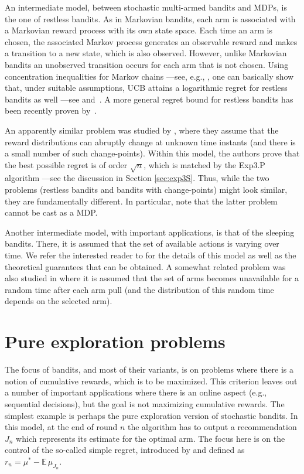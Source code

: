 \documentclass[11pt]{hackednow}
\newcommand{\E}{\mathbb{E}}
\begin{document}
An intermediate model, between stochastic multi-armed bandits and MDPs, is the one of restless bandits. As in Markovian bandits, each arm is associated with a Markovian reward process with its own state space. Each time an arm is chosen, the associated Markov process generates an observable reward and makes a transition to a new state, which is also observed. However, unlike Markovian bandits an unobserved transition occurs for each arm that is not chosen. Using concentration inequalities for Markov chains ---see, e.g., \cite{Lez98}, one can basically show that, under suitable assumptions, UCB attains a logarithmic regret for restless bandits as well ---see \cite{TL11} and~\cite{filippi2011optimally}. A more general regret bound for restless bandits has been recently proven by~\cite{ortner2012regret}.

An apparently similar problem was studied by \cite{GM11}, where they assume that the reward distributions can abruptly change at unknown time instants (and there is a small number of such change-points). Within this model, the authors prove that the best possible regret is of order $\sqrt{n}$, which is matched by the Exp3.P algorithm ---see the discussion in Section \ref{sec:exp3S}. Thus, while the two problems (restless bandits and bandits with change-points) might look similar, they are fundamentally different. In particular, note that the latter problem cannot be cast as a MDP.

Another intermediate model, with important applications, is that of the sleeping bandits. There, it is assumed that the set of available actions is varying over time. We refer the interested reader to \cite{KNS10, KMB09, slivkins2009contextual, KS12} for the details of this model as well as the theoretical guarantees that can be obtained. A somewhat related problem was also studied in \cite{GKSS07} where it is assumed that the set of arms becomes unavailable for a random time after each arm pull (and the distribution of this random time depends on the selected arm).

\section{Pure exploration problems}
The focus of bandits, and most of their variants, is on problems where there is a notion of cumulative rewards, which is to be maximized. This criterion leaves out a number of important applications where there is an online aspect (e.g., sequential decisions), but the goal is not maximizing cumulative rewards. The simplest example is perhaps the pure exploration version of stochastic bandits. In this model, at the end of round $n$ the algorithm has to output a recommendation $J_n$ which represents its estimate for the optimal arm. The focus here is on the control of the so-called simple regret, introduced by \cite{BMS09, BMS11} and defined as $r_n = \mu^* - \E\,\mu_{J_n}$.
\end{document}
